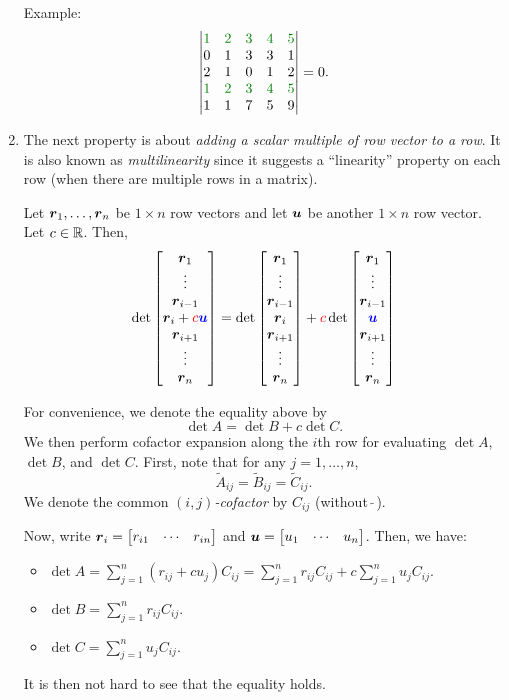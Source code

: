 \begin{enumerate}
Example:
\[
\mqty|\gc{1}&\gc{2}&\gc{3}&\gc{4}&\gc{5}\\ 0&1&3&3&1\\ 2&1&0&1&2\\ \gc{1}&\gc{2}&\gc{3}&\gc{4}&\gc{5}\\ 1&1&7&5&9|
=0.
\]

\item The next property is about \emph{adding a scalar multiple of row vector
to a row}. It is also known as \emph{multilinearity} since it suggests a
``linearity'' property on each row (when there are multiple rows in a matrix).
\begin{proposition}[Multilinearity]
\label{prp:det-multilinear}
Let \(\vb*{r}_{1},\dotsc,\vb*{r}_{n}\) be \(1\times n\) row vectors and let
\(\vb*{u}\) be another \(1\times n\) row vector. Let \(c\in\mathbb{R}\). Then,
\[
\det\mqty[\vect{r}_{1}\\\vdots\\ \vect{r}_{i-1}\\ \vect{r}_{i}+\rc{c}\blc{\vect{u}}\\
\vect{r}_{i+1}\\ \vdots\\ \vect{r}_{n}]
=
\det\mqty[\vect{r}_{1}\\\vdots\\ \vect{r}_{i-1}\\ \vect{r}_{i}\\
\vect{r}_{i+1}\\ \vdots\\ \vect{r}_{n}]
+\rc{c}\det\mqty[\vect{r}_{1}\\\vdots\\ \vect{r}_{i-1}\\ \blc{\vect{u}}\\
\vect{r}_{i+1}\\ \vdots\\ \vect{r}_{n}]
\]
\end{proposition}
\begin{pf}
For convenience, we denote the equality above by
\[
\det A=\det B+c\det C.
\]
We then perform cofactor expansion along the \(i\)th row for evaluating \(\det
A\), \(\det B\), and \(\det C\). First, note that for any \(j=1,\dotsc,n\),
\[
\widetilde{A}_{ij}=\widetilde{B}_{ij}=\widetilde{C}_{ij}.
\]
We denote the common \emph{\((i,j)\)-cofactor} by \(C_{ij}\) (without
\(\widetilde{\;}\)).

Now, write \(\vect{r}_{i}=\mqty[r_{i1}&\cdots&r_{in}]\) and
\(\vect{u}=\mqty[u_1&\cdots&u_n]\). Then, we have:
\begin{itemize}
\item \(\displaystyle \det A=\sum_{j=1}^{n}(r_{ij}+cu_{j})C_{ij}=\sum_{j=1}^{n}r_{ij}C_{ij}+c\sum_{j=1}^{n}u_{j}C_{ij}.\)
\item \(\displaystyle \det B=\sum_{j=1}^{n}r_{ij}C_{ij}.\)
\item \(\displaystyle \det C=\sum_{j=1}^{n}u_{j}C_{ij}.\)
\end{itemize}
It is then not hard to see that the equality holds.
\end{pf}


\end{enumerate}
